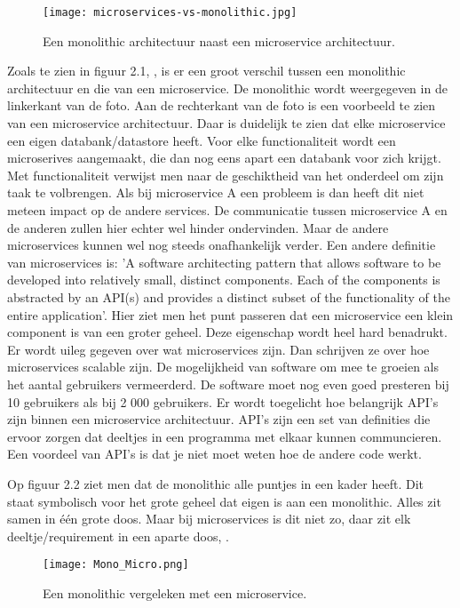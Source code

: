 \begin{figure}[h]
	\texttt{[image: microservices-vs-monolithic.jpg]}
	\centering
	\caption{Een monolithic architectuur naast een microservice architectuur. \textcite{Watts2018}}
\end{figure}
Zoals te zien in figuur 2.1, \textcite{Watts2018}, is er een groot verschil tussen een monolithic architectuur en die van een microservice. De monolithic wordt  weergegeven in de linkerkant van de foto. Aan de rechterkant van de foto is een voorbeeld te zien van een microservice architectuur. Daar is duidelijk te zien dat elke microservice een eigen databank/datastore heeft. Voor elke functionaliteit wordt een microserives aangemaakt, die dan nog eens apart een databank voor zich krijgt. Met functionaliteit verwijst men naar de geschiktheid van het onderdeel om zijn taak te volbrengen. Als bij microservice A een probleem is dan heeft dit niet meteen impact op de andere services. De communicatie tussen microservice A en de anderen zullen hier echter wel hinder ondervinden. Maar de andere microservices kunnen wel nog steeds onafhankelijk verder. 
Een andere definitie van microservices is: 'A software architecting pattern that allows software to be developed into relatively small, distinct components. Each of the components is abstracted by an API(s) and provides a distinct subset of the functionality of the entire application'. Hier ziet men het punt passeren dat een microservice een klein component is van een groter geheel. Deze eigenschap wordt heel hard benadrukt. Er wordt uileg gegeven over wat microservices zijn. Dan schrijven ze over hoe microservices scalable zijn. De mogelijkheid van software om mee te groeien als het aantal gebruikers vermeerderd. De software moet nog even goed presteren bij 10 gebruikers als bij 2 000 gebruikers. Er wordt toegelicht hoe belangrijk API's zijn binnen een microservice architectuur. API's zijn een set van definities die ervoor zorgen dat deeltjes in een programma met elkaar kunnen communcieren. Een voordeel van API's is dat je niet moet  weten hoe de andere code werkt.

 Op figuur 2.2 ziet men dat de monolithic alle puntjes in een kader heeft. Dit staat symbolisch voor het grote geheel dat eigen is aan een monolithic. Alles zit samen in één grote doos. Maar bij microservices is dit niet zo, daar zit elk deeltje/requirement in een aparte doos, \textcite{Benetis2016a} . 
\begin{figure}[h]
	\texttt{[image: Mono\_Micro.png]}
	\centering
	\caption{Een monolithic vergeleken met een microservice. \textcite{Benetis2016a}}
\end{figure}

